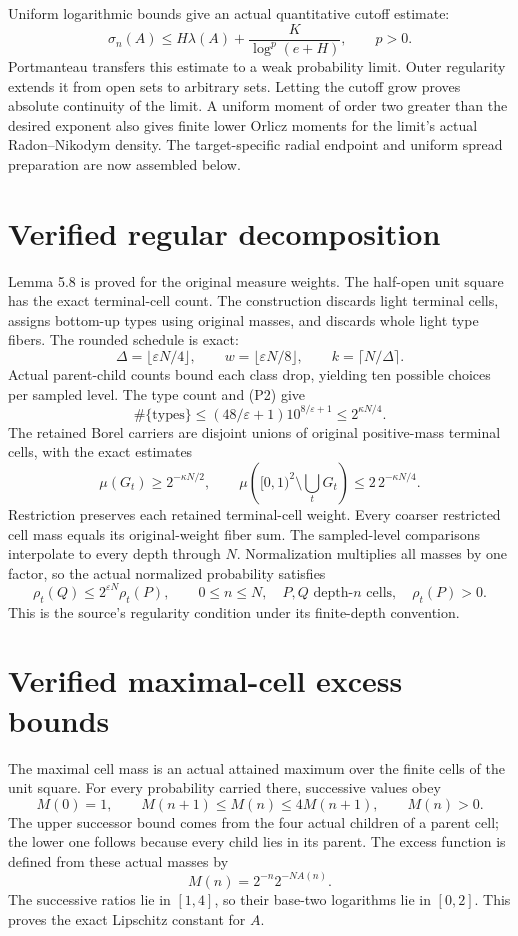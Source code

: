 \documentclass[11pt]{article}
\begin{document}
Uniform logarithmic bounds give an actual quantitative cutoff estimate:
\[
\sigma_n(A)\le H\lambda(A)+\frac{K}{\log^p(e+H)},\qquad p>0.
\]
Portmanteau transfers this estimate to a weak probability limit. Outer
regularity extends it from open sets to arbitrary sets. Letting the cutoff
grow proves absolute continuity of the limit. A uniform moment of order two
greater than the desired exponent also gives finite lower Orlicz moments for
the limit's actual Radon--Nikodym density. The target-specific radial endpoint
and uniform spread preparation are now assembled below.

\newpage
\section*{Verified regular decomposition}
Lemma 5.8 is proved for the original measure weights. The half-open unit
square has the exact terminal-cell count. The construction discards light
terminal cells, assigns bottom-up types using original masses, and discards
whole light type fibers. The rounded schedule is exact:
\[
\Delta=\lfloor\varepsilon N/4\rfloor,\qquad
w=\lfloor\varepsilon N/8\rfloor,\qquad k=\lceil N/\Delta\rceil.
\]
Actual parent-child counts bound each class drop, yielding ten possible
choices per sampled level. The type count and (P2) give
\[
\#\{\text{types}\}\le(48/\varepsilon+1)10^{8/\varepsilon+1}
\le2^{\kappa N/4}.
\]
The retained Borel carriers are disjoint unions of original positive-mass
terminal cells, with the exact estimates
\[
\mu(G_t)\ge2^{-\kappa N/2},\qquad
\mu\left([0,1)^2\setminus\bigcup_tG_t\right)\le2\,2^{-\kappa N/4}.
\]
Restriction preserves each retained terminal-cell weight. Every coarser
restricted cell mass equals its original-weight fiber sum. The sampled-level
comparisons interpolate to every depth through $N$. Normalization multiplies
all masses by one factor, so the actual normalized probability satisfies
\[
\rho_t(Q)\le2^{\varepsilon N}\rho_t(P),\qquad
0\le n\le N,\quad P,Q\text{ depth-}n\text{ cells},\quad\rho_t(P)>0.
\]
This is the source's regularity condition under its finite-depth convention.

\newpage
\section*{Verified maximal-cell excess bounds}
The maximal cell mass is an actual attained maximum over the finite cells of
the unit square. For every probability carried there, successive values obey
\[
M(0)=1,\qquad M(n+1)\le M(n)\le4M(n+1),\qquad M(n)>0.
\]
The upper successor bound comes from the four actual children of a parent
cell; the lower one follows because every child lies in its parent. The
excess function is defined from these actual masses by
\[
M(n)=2^{-n}2^{-NA(n)}.
\]
The successive ratios lie in $[1,4]$, so their base-two logarithms lie in
$[0,2]$. This proves the exact Lipschitz constant for $A$.
\end{document}
